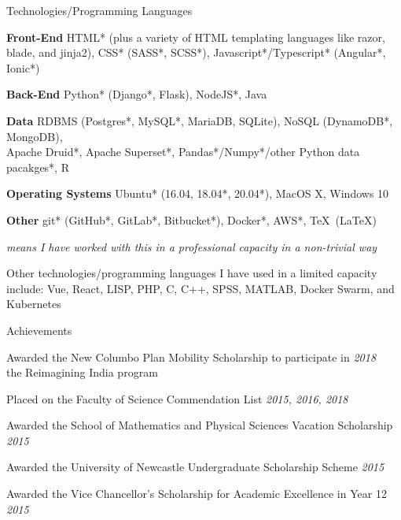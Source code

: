 \documentclass{resume} %
\begin{document}
\begin{rSection}{Technologies/Programming Languages}
    \item {\bf Front-End} HTML* (plus a variety of HTML templating languages like razor, blade, and jinja2), CSS* (SASS*, SCSS*), Javascript*/Typescript* (Angular*, Ionic*)
    \item {\bf Back-End} Python* (Django*, Flask), NodeJS*, Java
    \item {\bf Data} RDBMS (Postgres*, MySQL*, MariaDB, SQLite), NoSQL (DynamoDB*, MongoDB), \\ Apache Druid*, Apache Superset*, Pandas*/Numpy*/other Python data pacakges*, R
    \item {\bf Operating Systems} Ubuntu* (16.04, 18.04*, 20.04*), MacOS X, Windows 10
    \item {\bf Other} git* (GitHub*, GitLab*, Bitbucket*), Docker*, AWS*, \TeX\ (\LaTeX)
    \item {\em * means I have worked with this in a professional capacity in a non-trivial way}
    \item Other technologies/programming languages I have used in a limited capacity include: Vue, React, LISP, PHP, C, C++, SPSS, MATLAB, Docker Swarm, and Kubernetes
\end{rSection}

\begin{rSection}{Achievements}
    \item Awarded the New Columbo Plan Mobility Scholarship to participate in \hfill {\em 2018} \\ the Reimagining India program
    \item Placed on the Faculty of Science Commendation List \hfill {\em 2015, 2016, 2018}
    \item Awarded the School of Mathematics and Physical Sciences Vacation Scholarship \hfill {\em 2015}
    \item Awarded the University of Newcastle Undergraduate Scholarship Scheme \hfill {\em 2015} \
    \item Awarded the Vice Chancellor's Scholarship for Academic Excellence in Year 12 \hfill {\em 2015}
\end{rSection}
\end{document}
